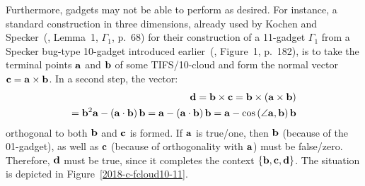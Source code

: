 Furthermore, gadgets may not be able to perform as desired.
For instance, a standard construction in three dimensions, already used by Kochen and Specker~(\cite{Kochen1}, Lemma~1, $\Gamma_1$, p.~68) for their construction of a
11-gadget $\Gamma_1$ from a Specker bug-type 10-gadget introduced earlier~(\cite{Kochen2}, Figure~1, p.~182),
is to take the terminal points ${\bf a}$ and ${\bf b}$ of some TIFS/10-cloud
and form the normal vector ${\bf c} = {\bf a} \times {\bf b}$.
In a second step, the vector:
\begin{equation}
\begin{split}
{\bf d} = {\bf b} \times {\bf c}
={\bf b} \times \left({\bf a} \times {\bf b}\right)  \\
 = {\bf b}^2 {\bf a} - \left({\bf a}\cdot {\bf b}\right) {\bf b}
= {\bf a} - \left({\bf a}\cdot {\bf b}\right) {\bf b}
 = {\bf a} - \cos \left( \angle {\bf a}, {\bf b}\right) {\bf b}
\end{split}
\end{equation}
orthogonal to both ${\bf b}$ and ${\bf c}$ is formed.
If ${\bf a}$ is true/one, then ${\bf b}$ (because of the 01-gadget), as well as ${\bf c}$ (because of orthogonality with ${\bf a}$) must be false/zero.
Therefore, ${\bf d}$ must be true, since it completes the context $\left\{ {\bf b},{\bf c},{\bf d}\right\}$.
The situation is depicted in Figure~\ref{2018-c-fcloud10-11}.
